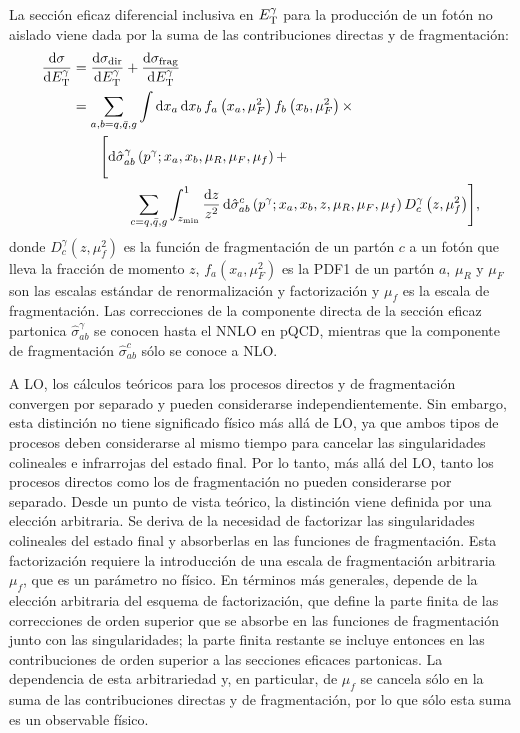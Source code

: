 La sección eficaz diferencial inclusiva en \(E_{\text{T}}^{\gamma}\) para la producción de un fotón no aislado viene dada por la suma de las contribuciones directas y de fragmentación:
\begin{align}
    \dv{\sigma}{\ensuremath{E_{\text{T}}^{\gamma}}} &= \dv{\sigma_{\text{dir}}}{\ensuremath{E_{\text{T}}^{\gamma}}} + \dv{\sigma_{\text{frag}}}{\ensuremath{E_{\text{T}}^{\gamma}}} \nonumber\\
    &= \sum_{a,b=q,\bar{q},g} \int \dd{x_a} \dd{x_b} f_a\left(x_a, \mu_F^2\right) f_b\left(x_b, \mu_F^2\right) \times \nonumber\\
    &\quad\quad
    \Biggl[
        \dd{\hat{\sigma}^{\gamma}_{ab} \left(p^{\gamma}; x_a, x_b, \mu_R, \mu_F, \mu_f\right)}
        + \nonumber\\
    &\quad\quad\quad\quad
    \sum_{c=q,\bar{q}, g} \int_{z_{\min}}^{1} \frac{\dd{z}}{z^2} \dd{\hat{\sigma}^c_{ab} \left(p^{\gamma}; x_a, x_b, z, \mu_R, \mu_F, \mu_f\right)} D_c^{\gamma} \left(z, \mu_f^2\right)
    \Biggr],
\end{align}
donde \(D_c^{\gamma} \left(z,\mu_f^2\right)\) es la función de fragmentación de un partón \(c\) a un fotón que lleva la fracción de momento \(z\), \(f_a \left(x_a, \mu^2_F \right)\) es la \ac{PDF1} de un partón \(a\), \(\mu_R\) y \(\mu_F\) son las escalas estándar de renormalización y factorización y \(\mu_f\) es la escala de fragmentación. Las correcciones de la componente directa de la sección eficaz partonica \(\hat{\sigma}^{\gamma}_{ab}\) se conocen hasta el \ac{NNLO} en \ac{pQCD}, mientras que la componente de fragmentación \(\hat{\sigma}^c_{ab}\) sólo se conoce a \ac{NLO}.

A \ac{LO}, los cálculos teóricos para los procesos directos y de fragmentación convergen por separado y pueden considerarse independientemente. Sin embargo, esta distinción no tiene significado físico más allá de \ac{LO}, ya que ambos tipos de procesos deben considerarse al mismo tiempo para cancelar las singularidades colineales e infrarrojas del estado final. Por lo tanto, más allá del \ac{LO}, tanto los procesos directos como los de fragmentación no pueden considerarse por separado. Desde un punto de vista teórico, la distinción viene definida por una elección arbitraria. Se deriva de la necesidad de factorizar las singularidades colineales del estado final y absorberlas en las funciones de fragmentación. Esta factorización requiere la introducción de una escala de fragmentación arbitraria \(\mu_f\), que es un parámetro no físico. En términos más generales, depende de la elección arbitraria del esquema de factorización, que define la parte finita de las correcciones de orden superior que se absorbe en las funciones de fragmentación junto con las singularidades; la parte finita restante se incluye entonces en las contribuciones de orden superior a las secciones eficaces partonicas. La dependencia de esta arbitrariedad y, en particular, de \(\mu_f\) se cancela sólo en la suma de las contribuciones directas y de fragmentación, por lo que sólo esta suma es un observable físico.






